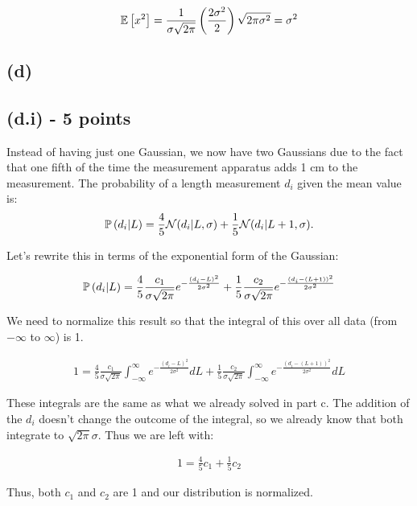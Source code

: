 \documentclass[11pt]{article}
\begin{document}
\begin{eqnarray*}
\mathbb{E}\left[x^2\right] = \frac{1}{\sigma\sqrt{2\pi}} \left(\frac{2\sigma^2}{2}\right) \sqrt{2 \pi \sigma^2} = \sigma^2
\end{eqnarray*}


\subsection*{(d)}

\subsection*{(d.i) - 5 points}
Instead of having just one Gaussian, we now have two Gaussians due to the fact that one fifth of the time the measurement apparatus adds 1 cm to the measurement. The probability of a length measurement $d_i$ given the mean value is:
\begin{equation}
\mathbb{P}\left(d_i|L\right) = \frac{4}{5}\mathcal{N}(d_i|L,\sigma) + \frac{1}{5}\mathcal{N}(d_i|L+1,\sigma).
\end{equation}

Let's rewrite this in terms of the exponential form of the Gaussian:

\begin{eqnarray*}
\mathbb{P}\left(d_i|L\right) = \frac{4}{5}\frac{c_1}{\sigma\sqrt{2\pi}} e^{-\frac{(d_i-L)^2}{2\sigma^2}} + \frac{1}{5}\frac{c_2}{\sigma\sqrt{2\pi}} e^{-\frac{(d_i-(L+1))^2}{2\sigma^2}}
\end{eqnarray*}

We need to normalize this result so that the integral of this over all data (from $-\infty$ to $\infty$) is 1.

\begin{eqnarray*}
1 = \frac{4}{5}\frac{c_1}{\sigma\sqrt{2\pi}} \int_{-\infty}^{\infty} e^{-\frac{(d_i-L)^2}{2\sigma^2}} dL + \frac{1}{5}\frac{c_2}{\sigma\sqrt{2\pi}} \int_{-\infty}^{\infty} e^{-\frac{(d_i-(L+1))^2}{2\sigma^2}} dL
\end{eqnarray*}

These integrals are the same as what we already solved in part c.  The addition of the $d_i$ doesn't change the outcome of the integral, so we already know that both integrate to $\sqrt{2\pi}\sigma$.  Thus we are left with:

\begin{eqnarray*}
1 = \frac{4}{5}c_1 + \frac{1}{5}c_2
\end{eqnarray*}

Thus, both $c_1$ and $c_2$ are 1 and our distribution is normalized.
\end{document}

